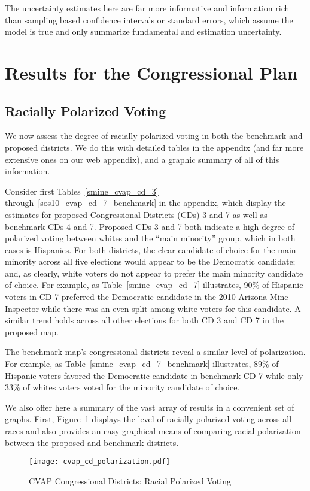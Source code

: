 \documentclass[12pt]{scrartcl}
\begin{document}
The uncertainty estimates here are far more informative and
information rich than sampling based confidence intervals or standard
errors, which assume the model is true and only summarize fundamental
and estimation uncertainty.

\section{Results for the Congressional Plan}

\subsection{Racially Polarized Voting}

We now assess the degree of racially polarized voting in both the
benchmark and proposed districts.  We do this with detailed tables in
the appendix (and far more extensive ones on our web appendix), and a
graphic summary of all of this information.

Consider first Tables~\ref{smine_cvap_cd_3}
through~\ref{sos10_cvap_cd_7_benchmark} in the appendix, which display
the estimates for proposed Congressional Districts (CDs) 3 and 7 as
well as benchmark CDs 4 and 7.  Proposed CDs 3 and 7 both indicate a
high degree of polarized voting between whites and the ``main
minority'' group, which in both cases is Hispanics. For both
districts, the clear candidate of choice for the main minority across
all five elections would appear to be the Democratic candidate; and,
as clearly, white voters do not appear to prefer the main minority
candidate of choice. For example, as Table~\ref{smine_cvap_cd_7}
illustrates, 90\% of Hispanic voters in CD 7 preferred the Democratic
candidate in the 2010 Arizona Mine Inspector while there was an even
split among white voters for this candidate. A similar trend holds
across all other elections for both CD 3 and CD 7 in the proposed map.

The benchmark map's congressional districts reveal a similar level of
polarization. For example, as Table~\ref{smine_cvap_cd_7_benchmark}
illustrates, 89\% of Hispanic voters favored the Democratic candidate
in benchmark CD 7 while only 33\% of whites voters voted for the
minority candidate of choice.

We also offer here a summary of the vast array of results in a
convenient set of graphs.  First, Figure~\ref{cvap_cd_polarization}
displays the level of racially polarized voting across all races and
also provides an easy graphical means of comparing racial polarization
between the proposed and benchmark districts.
\begin{figure}[p!h]
  \begin{centering}
    \texttt{[image: cvap\_cd\_polarization.pdf]}
    \caption{CVAP Congressional Districts: Racial Polarized Voting}
  \end{centering}
  \label{cvap_cd_polarization}
\end{figure}
\end{document}
